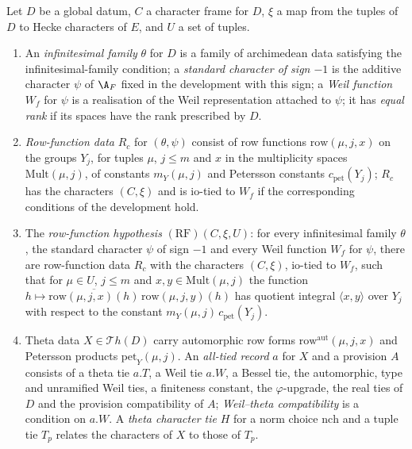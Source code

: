\begin{definition}\label{pf:baselat1:def:alltied}
Let $D$ be a global datum, $C$ a character frame for $D$, $\xi$ a map from the tuples of $D$ to Hecke characters of
$E$, and $U$ a set of tuples.
\begin{enumerate}[label=(\alph*)]
\item An \emph{infinitesimal family} $\theta$ for $D$ is a family of archimedean data satisfying the
  infinitesimal-family condition; a \emph{standard character of sign $-1$} is the additive character $\psi$ of $\A_F$ fixed in the
  development with this sign; a \emph{Weil function} $W_f$ for $\psi$ is a realisation of the Weil representation
  attached to $\psi$; it has \emph{equal rank} if its spaces have the rank prescribed by $D$.
\item \emph{Row-function data} $R_c$ for $(\theta,\psi)$ consist of row functions $\mathrm{row}(\mu,j,x)$ on the
  groups $Y_j$, for tuples $\mu$, $j\le m$ and $x$ in the multiplicity spaces $\mathrm{Mult}(\mu,j)$, of constants
  $m_Y(\mu,j)$ and Petersson constants $c_{\mathrm{pet}}(Y_j)$; $R_c$ has the characters $(C,\xi)$ and is $\mathrm{io}$-tied
  to $W_f$ if the corresponding conditions of the development hold.
\item The \emph{row-function hypothesis} $(\mathrm{RF})(C,\xi,U)$: for every infinitesimal family $\theta$, the standard
  character $\psi$ of sign $-1$ and every Weil function $W_f$ for $\psi$, there are row-function data $R_c$ with the
  characters $(C,\xi)$, $\mathrm{io}$-tied to $W_f$, such that for $\mu\in U$, $j\le m$ and $x,y\in\mathrm{Mult}(\mu,j)$ the
  function $h\mapsto\overline{\mathrm{row}(\mu,j,x)(h)}\,\mathrm{row}(\mu,j,y)(h)$ has quotient integral $\langle x,y\rangle$
  over $Y_j$ with respect to the constant $m_Y(\mu,j)\,c_{\mathrm{pet}}(Y_j)$.
\item Theta data $X\in\mathcal Th(D)$ carry automorphic row forms $\mathrm{row}^{\mathrm{aut}}(\mu,j,x)$ and Petersson products
  $\mathrm{pet}_Y(\mu,j)$. An \emph{all-tied record} $a$ for $X$ and a provision $A$ consists of a theta tie $a.T$, a Weil
  tie $a.W$, a Bessel tie, the automorphic, type and unramified Weil ties, a finiteness constant, the
  $\varphi$-upgrade, the real ties of $D$ and the provision compatibility of $A$; \emph{Weil--theta compatibility}
  is a condition on $a.W$. A \emph{theta character tie} $H$ for a norm choice $\mathrm{nch}$ and a tuple tie $T_p$ relates
  the characters of $X$ to those of $T_p$.
\end{enumerate}
\end{definition}

